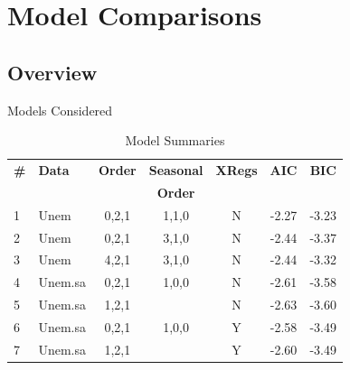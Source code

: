 \documentclass{beamer}
\begin{document}

    \section{Model Comparisons}
    
    \subsection{Overview}
  \begin{frame}{Models Considered}
\begin{table}[H]
\centering
\caption{Model Summaries}
\begin{tabular}{llccccc}
  \hline
 \textbf{\#}& \textbf{Data}  & \textbf{Order} & \textbf{Seasonal} & \textbf{XRegs} & \textbf{AIC} & \textbf{BIC} \\
 &&&\textbf{Order}&&&\\ 
  \hline
1 & Unem  & 0,2,1 & 1,1,0 & N & -2.27 & -3.23 \\ 
  2 & Unem  & 0,2,1 & 3,1,0 & N & -2.44 & -3.37 \\ 
  3 & Unem  & 4,2,1 & 3,1,0 & N & -2.44 & -3.32 \\ 
  4 & Unem.sa & 0,2,1 & 1,0,0 & N & -2.61 & -3.58 \\ 
  5 & Unem.sa  & 1,2,1 &  & N & -2.63 & -3.60 \\ 
  6 & Unem.sa & 0,2,1 & 1,0,0 & Y & -2.58 & -3.49 \\ 
  7 & Unem.sa  & 1,2,1 &  & Y & -2.60 & -3.49 \\ 
   \hline
\end{tabular}
\label{tab:models}
\end{table}
  \end{frame}
\end{document}
